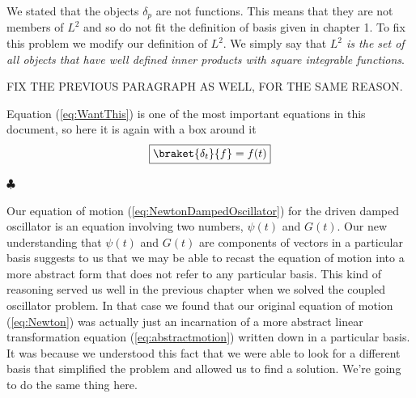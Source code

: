 We stated that the objects $\delta_{p}$ are not functions.  This means that they are not members of $L^2$ and so do not fit the definition of basis given in chapter 1.  To fix this problem we modify our definition of $L^2$.  We simply say that \emph{$L^2$ is the set of all objects that have well defined inner products with square integrable functions}.

FIX THE PREVIOUS PARAGRAPH AS WELL, FOR THE SAME REASON.

Equation (\ref{eq:WantThis}) is one of the most important equations in this document, so here it is again with a box around it
\begin{displaymath} \framebox{$\braket{\delta_t}{f}=f(t)$} \end{displaymath}

\begin{flushleft} $\clubsuit$ \end{flushleft}
Our equation of motion (\ref{eq:NewtonDampedOscillator}) for the driven damped oscillator is an equation involving two numbers, $\psi(t)$ and $G(t)$.
Our new understanding that $\psi(t)$ and $G(t)$ are components of vectors in a particular basis suggests to us that we may be able to recast the equation of motion into a more abstract form that does not refer to any particular basis.
This kind of reasoning served us well in the previous chapter when we solved the coupled oscillator problem.
In that case we found that our original equation of motion (\ref{eq:Newton}) was actually just an incarnation of a more abstract linear transformation equation (\ref{eq:abstractmotion}) written down in a particular basis.
It was because we understood this fact that we were able to look for a different basis that simplified the problem and allowed us to find a solution.
We're going to do the same thing here.


